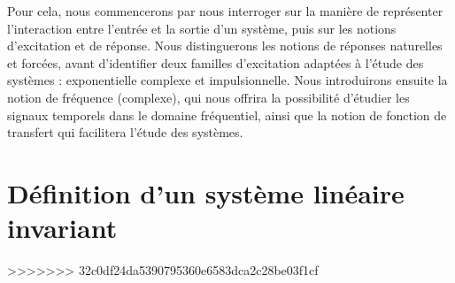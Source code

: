 Pour cela, nous commencerons par nous interroger sur la manière de
représenter l'interaction entre l'entrée et la sortie d'un système,
puis sur les notions d'excitation et de réponse. Nous distinguerons
les notions de réponses naturelles et forcées, avant d'identifier deux
familles d'excitation adaptées à l'étude des systèmes : exponentielle
complexe et impulsionnelle. Nous introduirons ensuite la notion de
fréquence (complexe), qui nous offrira la possibilité d'étudier les
signaux temporels dans le domaine fréquentiel, ainsi que la notion de
fonction de transfert qui facilitera l'étude des systèmes.
	
	
\section{Définition d'un système linéaire invariant}
>>>>>>> 32c0df24da5390795360e6583dca2c28be03f1cf

